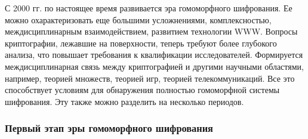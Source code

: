     С 2000 гг. по настоящее время развивается эра гомоморфного шифрования. Ее можно охарактеризовать еще большими усложнениями, комплексностью, междисциплинарным взаимодействием, развитием технологии WWW. Вопросы криптографии, лежавшие на поверхности, теперь требуют более глубокого анализа, что повышает требования к квалификации исследователей. Формируется междисциплинарная связь между криптографией и другими научными областями, например, теорией множеств, теорией игр, теорией телекоммуникаций. \cite{DentCryptoCoding-03} Все это способствует условиям для обнаружения полностью гомоморфной системы шифрования. Эту также можно разделить на несколько периодов.\par

    \subsubsection{Первый этап эры гомоморфного шифрования}

